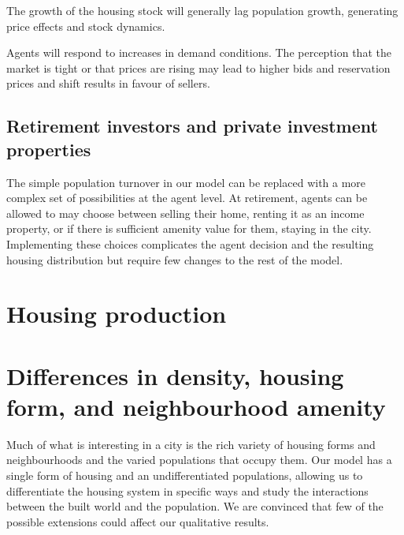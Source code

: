 The growth of the housing stock will generally lag population growth, generating price effects and stock dynamics.

Agents will respond to increases in demand conditions. The perception that the market is tight or that prices are rising may lead to higher bids and reservation prices and shift results in favour of sellers.  





\subsection{Retirement investors and private investment properties}
The simple population turnover in our model can be replaced with a more complex set of possibilities at the agent level.  At retirement,  agents can be allowed to may choose between selling their home, renting it as an income property, or if there is sufficient amenity value for them, staying in the city. Implementing these choices complicates the agent decision and the resulting housing distribution but require few changes to the rest of the model.

\section{Housing production}

\section{Differences in density, housing form, and neighbourhood amenity}
Much of what is interesting in a city is the rich variety of housing forms and neighbourhoods and the varied populations that occupy them. Our model has a single form of housing and an undifferentiated populations, allowing us to differentiate the housing system in specific ways and study the interactions between the built world and the population. We are convinced that few of the possible extensions could affect our qualitative results. 

